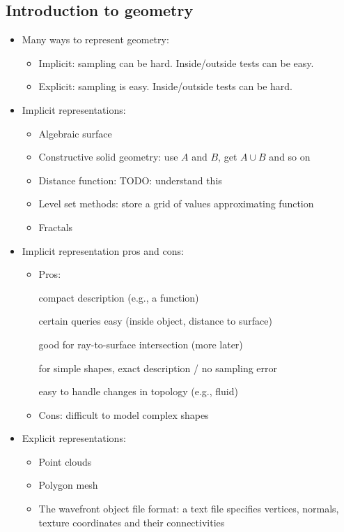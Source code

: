 \documentclass{article}
\begin{document}
\subsection{Introduction to geometry}
\begin{itemize}
    \item Many ways to represent geometry:
    \begin{itemize}
        \item Implicit: sampling can be hard. Inside/outside tests can be easy.
        \item Explicit: sampling is easy. Inside/outside tests can be hard.
    \end{itemize}
    
    \item Implicit representations:
    \begin{itemize}
        \item Algebraic surface
        \item Constructive solid geometry: use $A$ and $B$, get $A\cup B$ and so on
        \item Distance function: TODO: understand this
        \item Level set methods: store a grid of values approximating function
        \item Fractals
    \end{itemize}
    
    \item Implicit representation pros and cons:
    \begin{itemize}
         \item Pros:  
         
         compact description (e.g., a function) 
         
         certain queries easy (inside object, distance to surface) 
         
         good for ray-to-surface intersection (more later) 
         
         for simple shapes, exact description / no sampling error 
         
         easy to handle changes in topology (e.g., fluid) 
         \item Cons: difficult to model complex shapes
    \end{itemize}
    
    \item Explicit representations:
    \begin{itemize}
        \item Point clouds
        
        \item Polygon mesh
        
        \item The wavefront object file format: a text file specifies vertices, normals, texture coordinates and their connectivities
    \end{itemize}
    
\end{itemize}
\end{document}
